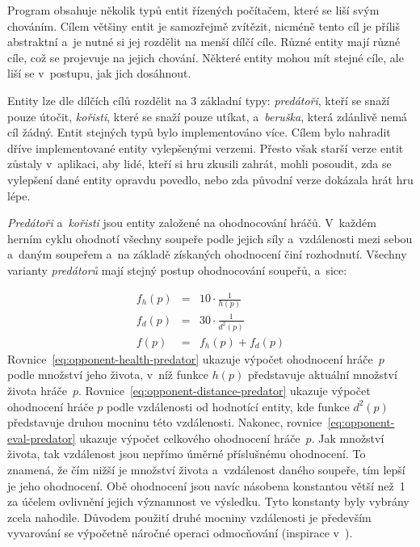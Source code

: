 Program obsahuje několik typů entit řízených počítačem, které se liší svým chováním. Cílem většiny entit je samozřejmě zvítězit, nicméně tento cíl je příliš abstraktní a~je nutné si jej rozdělit na menší dílčí cíle. Různé entity mají různé cíle, což se projevuje na jejich chování. Některé entity mohou mít stejné cíle, ale liší se v~postupu, jak jich dosáhnout.

Entity lze dle dílčích cílů rozdělit na 3 základní typy: \emph{predátoři}, kteří se snaží pouze útočit, \emph{kořisti}, které se snaží pouze utíkat, a~\emph{beruška}, která zdánlivě nemá cíl žádný. Entit stejných typů bylo implementováno více. Cílem bylo nahradit dříve implementované entity vylepšenými verzemi. Přesto však starší verze entit zůstaly v~aplikaci, aby lidé, kteří si hru zkusili zahrát, mohli posoudit, zda se vylepšení dané entity opravdu povedlo, nebo zda původní verze dokázala hrát hru lépe.

\emph{Predátoři} a~\emph{kořisti} jsou entity založené na ohodnocování hráčů. V~každém herním cyklu ohodnotí všechny soupeře podle jejich síly a~vzdálenosti mezi sebou a~daným soupeřem a~na základě získaných ohodnocení činí rozhodnutí. Všechny varianty \emph{predátorů} mají stejný postup ohodnocování soupeřů, a~sice:

\begin{eqnarray}
    \label{eq:opponent-health-predator}
    f_h(p) & = & 10 \cdot \frac{1}{h(p)} \\
    \label{eq:opponent-distance-predator}
    f_d(p) & = & 30 \cdot \frac{1}{d^2(p)} \\
    \label{eq:opponent-eval-predator}
    f(p) & = & f_h(p) + f_d(p)
\end{eqnarray}
Rovnice~\eqref{eq:opponent-health-predator} ukazuje výpočet ohodnocení hráče~$p$ podle množství jeho života, v~níž funkce $h(p)$ představuje aktuální množství života hráče~$p$. Rovnice~\eqref{eq:opponent-distance-predator} ukazuje výpočet ohodnocení hráče $p$ podle vzdálenosti od hodnotící entity, kde funkce $d^2(p)$ představuje druhou mocninu této vzdálenosti. Nakonec, rovnice~\eqref{eq:opponent-eval-predator} ukazuje výpočet celkového ohodnocení hráče~$p$. Jak množství života, tak vzdálenost jsou nepřímo úměrné příslušnému ohodnocení. To znamená, že čím nižší je množství života a~vzdálenost daného soupeře, tím lepší je jeho ohodnocení. Obě ohodnocení jsou navíc násobena konstantou větší než~1 za účelem ovlivnění jejich významnost ve výsledku. Tyto konstanty byly vybrány zcela nahodile. Důvodem použití druhé mocniny vzdálenosti je především vyvarování se výpočetně náročné operaci odmocňování (inspirace v~\cite{CGAL_Exact_Computation_paradigm}).

